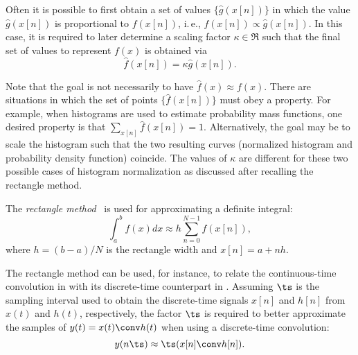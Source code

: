 Often it is possible to first obtain a set of values $\{ \hat g(x[n]) \}$ in which the value $\hat g(x[n])$ is proportional to $f(x[n])$, i.\,e., 
$f(x[n]) \propto \hat g(x[n])$. In this case, it is required to later determine a scaling factor $\kappa \in \Re$ such that the final set of values to represent $f(x)$ is obtained via
\begin{equation}
\hat f(x[n]) =\kappa \hat g(x[n]).
\label{eq:kappa_as_normalization_factor}
\end{equation}

Note that the goal is not necessarily to have $\hat f(x) \approx f(x)$. There are situations in which the set of points $\{ \hat f(x[n]) \}$ must obey a property. For example, when histograms are used to estimate probability mass functions, one desired property is that $\sum_{x[n]} \hat f(x[n]) = 1$. Alternatively, the goal may be to scale the histogram such that the two resulting curves (normalized histogram and probability density function) coincide. The values of $\kappa$ are different for these two possible cases of histogram normalization as discussed after recalling the rectangle method.




The \emph{rectangle method}~ is used for approximating a definite integral:
\begin{equation}
\int_a^b f(x) dx \approx h \sum_{n=0}^{N-1} f(x[n]),
\label{eq:rectangle_method}
\end{equation}
where $h=(b-a)/N$ is the rectangle width and $x[n]=a+n h$. 

The rectangle method can be used, for instance, to relate the continuous-time convolution in
 with its discrete-time counterpart in
. Assuming $\ts$ is the sampling interval used to obtain the discrete-time signals $x[n]$ and $h[n]$ from $x(t)$ and $h(t)$, respectively, the factor $\ts$ is required 
to better approximate the samples of $y(t) = x(t) \conv h(t)$ when using a discrete-time convolution:
\begin{equation}
y(n \ts) \approx  \ts (x[n] \conv h[n]).
\label{eq:continuous_convolution_via_discrete}
\end{equation}

